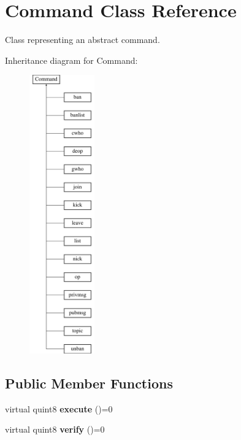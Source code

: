 \hypertarget{class_command}{\section{Command Class Reference}
\label{class_command}
}


Class representing an abstract command.  


Inheritance diagram for Command\-:\begin{figure}[H]
\begin{center}
\leavevmode
\includegraphics[height=12.000000cm]{class_command}
\end{center}
\end{figure}
\subsection*{Public Member Functions}
\begin{DoxyCompactItemize}
\item 
\hypertarget{class_command_a20fa39890f59b06436d0d0a8d92b7a06}{virtual quint8 {\bfseries execute} ()=0}\label{class_command_a20fa39890f59b06436d0d0a8d92b7a06}

\item 
\hypertarget{class_command_a14753bb776573d337310c879142e0a27}{virtual quint8 {\bfseries verify} ()=0}\label{class_command_a14753bb776573d337310c879142e0a27}

\end{DoxyCompactItemize}
